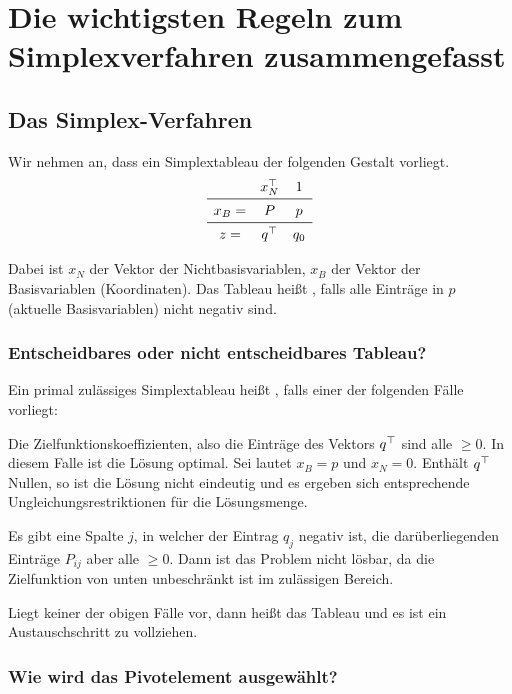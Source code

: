 
\section{Die wichtigsten Regeln zum Simplexverfahren zusammengefasst}

\subsection{Das Simplex-Verfahren}

Wir nehmen an, dass ein Simplextableau der folgenden Gestalt vorliegt.
$$
\begin{matrix}
    & x_N^{\trans} & 1 \\
    \midrule
    x_B = & P & p \\
    \midrule
    z = & q^\trans & q_0 
\end{matrix}
$$

Dabei ist $x_N$ der Vektor der Nichtbasisvariablen, $x_B$ der Vektor der Basisvariablen (Koordinaten). Das Tableau heißt , falls alle Einträge in $p$ (aktuelle Basisvariablen) nicht negativ sind.

\subsubsection{Entscheidbares oder nicht entscheidbares Tableau?}

Ein primal zulässiges Simplextableau heißt , falls einer der folgenden Fälle vorliegt:
\begin{statements}
    \item Die Zielfunktionskoeffizienten, also die Einträge des Vektors $q^\top$ sind alle $\geq 0$. In diesem Falle ist die Lösung optimal. Sei lautet $x_B=p$ und $x_N=0$. Enthält $q^\top$ Nullen, so ist die Lösung nicht eindeutig und es ergeben sich entsprechende Ungleichungsrestriktionen für die Lösungsmenge.
    \item Es gibt eine Spalte $j$, in welcher der Eintrag $q_j$ negativ ist, die darüberliegenden Einträge $P_{ij}$ aber alle $\geq 0$. Dann ist das Problem nicht lösbar, da die Zielfunktion von unten unbeschränkt ist im zulässigen Bereich.
\end{statements}

Liegt keiner der obigen Fälle vor, dann heißt das Tableau  und es ist ein Austauschschritt zu vollziehen.

\subsubsection{Wie wird das Pivotelement ausgewählt?}

